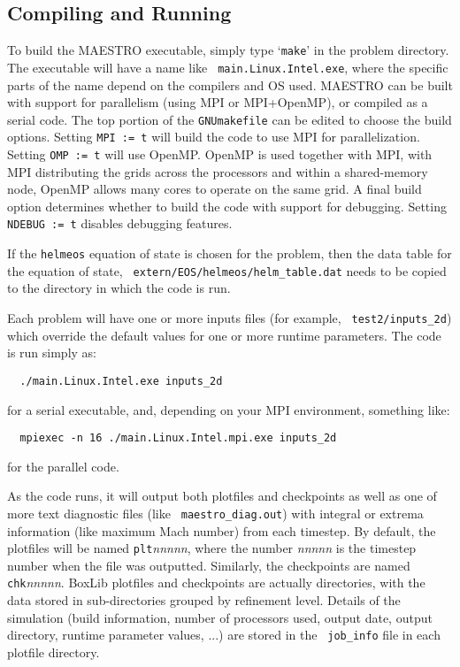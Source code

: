 \subsection{Compiling and Running}

To build the MAESTRO executable, simply type `{\tt make}' in the
problem directory.  The executable will have a name like {\tt
  main.Linux.Intel.exe}, where the specific parts of the name depend
on the compilers and OS used.  MAESTRO can be built with support for
parallelism (using MPI or MPI+OpenMP), or compiled as a serial code.
The top portion of the {\tt GNUmakefile} can be edited to choose the
build options.  Setting {\tt MPI := t} will build the code to use MPI
for parallelization.  Setting {\tt OMP := t} will use OpenMP.  OpenMP
is used together with MPI, with MPI distributing the grids across the
processors and within a shared-memory node, OpenMP allows many cores
to operate on the same grid.  A final build option determines whether
to build the code with support for debugging.  Setting {\tt NDEBUG :=
  t} disables debugging features.

If the {\tt helmeos} equation of state is chosen for the problem, then
the data table for the equation of state, {\tt
  extern/EOS/helmeos/helm\_table.dat} needs to be copied to the
directory in which the code is run.

Each problem will have one or more inputs files (for example, {\tt
  test2/inputs\_2d}) which override the default values for one or more
runtime parameters.  The code is run simply as:
\begin{verbatim}
  ./main.Linux.Intel.exe inputs_2d
\end{verbatim}
for a serial executable, and, depending on your MPI environment, something like:
\begin{verbatim}
  mpiexec -n 16 ./main.Linux.Intel.mpi.exe inputs_2d
\end{verbatim}
for the parallel code.

As the code runs, it will output both plotfiles and checkpoints as
well as one of more text diagnostic files (like {\tt
  maestro\_diag.out}) with integral or extrema information (like
maximum Mach number) from each timestep.  By default, the plotfiles
will be named {\tt plt}{\em nnnnn}, where the number {\em nnnnn} is
the timestep number when the file was outputted.  Similarly, the
checkpoints are named {\tt chk}{\em nnnnn}.  BoxLib plotfiles and
checkpoints are actually directories, with the data stored in
sub-directories grouped by refinement level.  Details of the simulation
(build information, number of processors used, output date, output
directory, runtime parameter values, ...) are stored in the {\tt
  job\_info} file in each plotfile directory.


